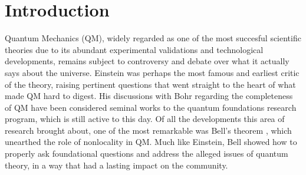 \documentclass[12pt,a4paper,notitlepage]{report}
\begin{document}
\thispagestyle{empty}

\renewcommand\listfigurename{{\footnotesize \centerline{LIST OF FIGURES}}}

\cleardoublepage
\begingroup
\makeatletter
\let\ps@plain\ps@empty
\makeatother

\pagestyle{empty}
\listoffigures
\cleardoublepage
\endgroup

\renewcommand\contentsname{{\footnotesize \centerline{CONTENTS}}}


\cleardoublepage
\begingroup
\makeatletter
\let\ps@plain\ps@empty
\makeatother

\pagestyle{empty}
\tableofcontents
\cleardoublepage
\endgroup


\chapter{Introduction}
\setcounter{page}{1}

Quantum Mechanics (QM), widely regarded as one of the most succesful scientific theories due to its abundant experimental validations and technological developments, remains subject to controversy and debate over what it actually says about the universe. Einstein was perhaps the most famous and earliest critic of the theory, raising pertinent questions that went straight to the heart of what made QM hard to digest. His discussions with Bohr regarding the completeness of QM \cite{epr_1935, bohr_1935} have been considered seminal works to the quantum foundations research program, which is still active to this day. Of all the developments this area of research brought about, one of the most remarkable was Bell's theorem \cite{bell_1964}, which unearthed the role of nonlocality in QM.
Much like Einstein, Bell showed how to properly ask foundational questions and address the alleged issues of quantum theory, in a way that had a lasting impact on the community.
\end{document}
